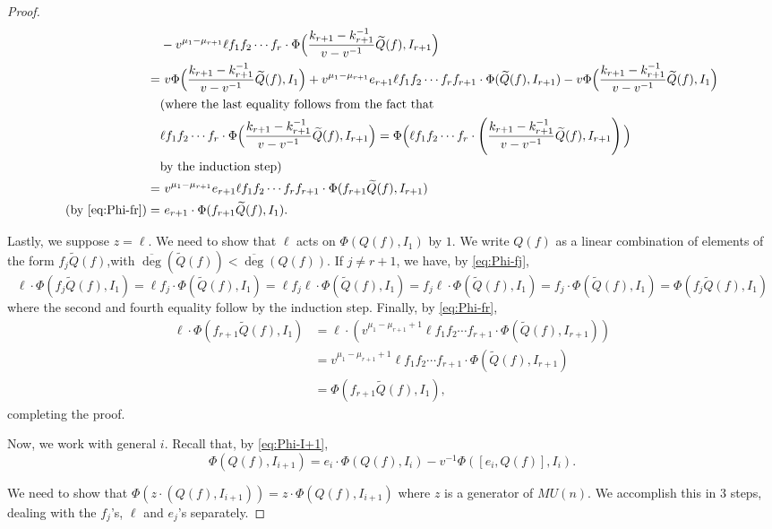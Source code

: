 \documentclass[10pt,a4paper]{amsart}
\newcommand{\ol}{\overline}
\begin{document}
\begin{proof}
\begin{align*}
&-v^{\mu_1-\mu_{r+1}}\ell f_1f_2\cdots f_r \cdot\Phi\Big(\frac{k_{r+1}-k_{r+1}^{-1}}{v-v^{-1}}\widetilde{Q}(f),I_{r+1}\Big)\\
=&~v\Phi\Big(\frac{k_{r+1}-k_{r+1}^{-1}}{v-v^{-1}}\widetilde Q(f),I_1\Big) + v^{\mu_1-\mu_{r+1}}e_{r+1}\ell f_1f_2\cdots f_rf_{r+1}\cdot\Phi(\widetilde{Q}(f),I_{r+1}) -  v\Phi\Big(\frac{k_{r+1}-k_{r+1}^{-1}}{v-v^{-1}}\widetilde{Q}(f),I_{1}\Big)\\
&(\text{where the last equality follows from the fact that }\\
&\ell f_1f_2\cdots f_r \cdot\Phi\Big(\frac{k_{r+1}-k_{r+1}^{-1}}{v-v^{-1}}\widetilde{Q}(f),I_{r+1}\Big) = \Phi\Big(\ell f_1f_2\cdots f_r \cdot\left(\frac{k_{r+1}-k_{r+1}^{-1}}{v-v^{-1}}\widetilde{Q}(f),I_{r+1}\right)\Big)\\
&\text{by the induction step)}\\
=&~v^{\mu_1-\mu_{r+1}}e_{r+1}\ell f_1f_2\cdots f_rf_{r+1}\cdot\Phi(f_{r+1}\widetilde{Q}(f),I_{r+1})\\
\text{(by \eqref{eq:Phi-fr})}=&~e_{r+1}\cdot \Phi(f_{r+1}\widetilde{Q}(f),I_1).
\end{align*}

Lastly, we suppose $z=\ell$. We need to show that $\ell$ acts on $\Phi(Q(f), I_1)$ by $1$. We write $Q(f)$ as a linear combination of elements of the form $f_j\widetilde{Q}(f)$,with $\ol{\deg}(\widetilde{Q}(f))<\ol{\deg}(Q(f))$. If $j\neq r+1$, we have, by \eqref{eq:Phi-fj},
\[\ell\cdot \Phi(f_j\widetilde Q(f),I_1) =\ell f_j\cdot \Phi(\widetilde Q(f),I_1)= \ell f_j\ell\cdot \Phi(\widetilde Q(f),I_1) = f_j\ell\cdot \Phi(\widetilde Q(f),I_1)=f_j\cdot \Phi(\widetilde Q(f),I_1)=\Phi(f_j\widetilde Q(f),I_1)\]
where the second and fourth equality follow by the induction step.
Finally, by \eqref{eq:Phi-fr},
\begin{align*}
\ell\cdot \Phi(f_{r+1}\widetilde Q(f),I_1) &= \ell\cdot(v^{\mu_1-\mu_{r+1}+1}\ell f_1f_2\cdots f_{r+1} \cdot \Phi(\widetilde Q(f),I_{r+1}))\\
&= v^{\mu_1-\mu_{r+1}+1}\ell f_1f_2\cdots f_{r+1} \cdot \Phi(\widetilde Q(f),I_{r+1})\\
&= \Phi(f_{r+1}\widetilde Q(f),I_1),
\end{align*}completing the proof.

Now, we work with general $i$. Recall that, by \eqref{eq:Phi-I+1}, 
\[\Phi( Q(f),I_{i+1})=e_i\cdot \Phi( Q(f), I_i)-v^{-1}\Phi([e_i,Q(f)], I_{i}).\]

We need to show that $\Phi(z\cdot(Q(f), I_{i+1})) = z\cdot \Phi(Q(f), I_{i+1})$ where $z$ is a generator of $MU(n)$. We accomplish this in $3$ steps, dealing with the $f_j$'s, $\ell$ and $e_j$'s separately.


\end{proof}
\end{document}
